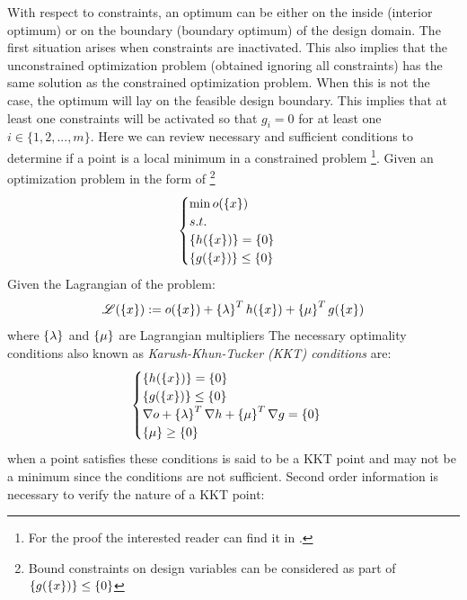 With respect to constraints, an optimum can be either on the inside (interior optimum) or on the boundary (boundary optimum) of the design domain. The first situation arises when constraints are inactivated. This also implies that the unconstrained optimization problem (obtained ignoring all constraints) has the same solution as the constrained optimization problem. When this is not the case, the optimum will lay on the feasible design boundary. This implies that at least one constraints will be activated so that $g_i=0$ for at least one $i\in\lbrace1,2,...,m\rbrace$. 
Here we can review necessary and sufficient conditions to determine if a point is a local minimum in a constrained problem \footnote{For the proof the interested reader can find it in \cite{papalambros2000principles}.}.
Given an optimization problem in the form of \footnote{Bound constraints on design variables can be considered as part of $\left\lbrace{g(\ensuremath\left\lbrace{x}\right \rbrace)}\right \rbrace\leq \left\lbrace{0}\right \rbrace$}
\begin{equation}
\begin{cases}
\min o(\left\lbrace{x}\right \rbrace)\\
s.t.\\
\left\lbrace{h(\ensuremath\left\lbrace{x}\right \rbrace)}\right \rbrace=\left\lbrace{0}\right \rbrace\\
\left\lbrace{g(\ensuremath\left\lbrace{x}\right \rbrace)}\right \rbrace\leq \left\lbrace{0}\right \rbrace
\end{cases}
\end{equation}
Given the Lagrangian of the problem:
\begin{equation}
\mathscr{L}(\left\lbrace{x}\right \rbrace):= o(\left\lbrace{x}\right \rbrace)+\left\lbrace{\lambda}\right \rbrace^T h(\left\lbrace{x}\right \rbrace)+\left\lbrace{\mu}\right \rbrace^T g(\left\lbrace{x}\right \rbrace) 
\end{equation}
where $\left\lbrace{\lambda}\right \rbrace$ and $\left\lbrace{\mu}\right \rbrace$ are Lagrangian multipliers
The necessary optimality conditions also known as \textit{Karush-Khun-Tucker (KKT) conditions} are:
\begin{equation}
\begin{cases}
\left\lbrace{h(\ensuremath\left\lbrace{x}\right \rbrace)}\right \rbrace=\left\lbrace{0}\right \rbrace\\
\left\lbrace{g(\ensuremath\left\lbrace{x}\right \rbrace)}\right \rbrace\leq \left\lbrace{0}\right \rbrace\\
\nabla o + \left\lbrace{\lambda}\right \rbrace^T\nabla h+\left\lbrace{\mu}\right \rbrace^T\nabla g=\left\lbrace{0}\right \rbrace\\
\left\lbrace{\mu}\right \rbrace\geq \left\lbrace{0}\right \rbrace
\end{cases}
\end{equation}
when a point satisfies these conditions is said to be a KKT point and may not be a minimum since the conditions are not sufficient. Second order information is necessary to verify the nature of a KKT point:\\
